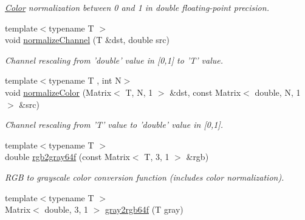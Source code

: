 \begin{DoxyCompactItemize}
\begin{DoxyCompactList}\small\item\em \hyperlink{class_d_o_1_1_color}{Color} normalization between 0 and 1 in double floating-\/point precision. \end{DoxyCompactList}\item 
\hypertarget{group___color_conversion_gaf2f95805ffea57b546cf2547806aae1b}{{\footnotesize template$<$typename T $>$ }\\void \hyperlink{group___color_conversion_gaf2f95805ffea57b546cf2547806aae1b}{normalize\-Channel} (T \&dst, double src)}\label{group___color_conversion_gaf2f95805ffea57b546cf2547806aae1b}

\begin{DoxyCompactList}\small\item\em Channel rescaling from 'double' value in \mbox{[}0,1\mbox{]} to 'T' value. \end{DoxyCompactList}\item 
\hypertarget{group___color_conversion_ga2d242024d4f8c533e01ffd1f231adf7a}{{\footnotesize template$<$typename T , int N$>$ }\\void \hyperlink{group___color_conversion_ga2d242024d4f8c533e01ffd1f231adf7a}{normalize\-Color} (Matrix$<$ T, N, 1 $>$ \&dst, const Matrix$<$ double, N, 1 $>$ \&src)}\label{group___color_conversion_ga2d242024d4f8c533e01ffd1f231adf7a}

\begin{DoxyCompactList}\small\item\em Channel rescaling from 'T' value to 'double' value in \mbox{[}0,1\mbox{]}. \end{DoxyCompactList}\item 
\hypertarget{group___color_conversion_ga04155a327ff725c0466e90ee1bdb6ecd}{{\footnotesize template$<$typename T $>$ }\\double \hyperlink{group___color_conversion_ga04155a327ff725c0466e90ee1bdb6ecd}{rgb2gray64f} (const Matrix$<$ T, 3, 1 $>$ \&rgb)}\label{group___color_conversion_ga04155a327ff725c0466e90ee1bdb6ecd}

\begin{DoxyCompactList}\small\item\em R\-G\-B to grayscale color conversion function (includes color normalization). \end{DoxyCompactList}\item 
\hypertarget{group___color_conversion_gaa88c55b9890d4ec25b7318fb12dbae6a}{{\footnotesize template$<$typename T $>$ }\\Matrix$<$ double, 3, 1 $>$ \hyperlink{group___color_conversion_gaa88c55b9890d4ec25b7318fb12dbae6a}{gray2rgb64f} (T gray)}\label{group___color_conversion_gaa88c55b9890d4ec25b7318fb12dbae6a}


\end{DoxyCompactItemize}
